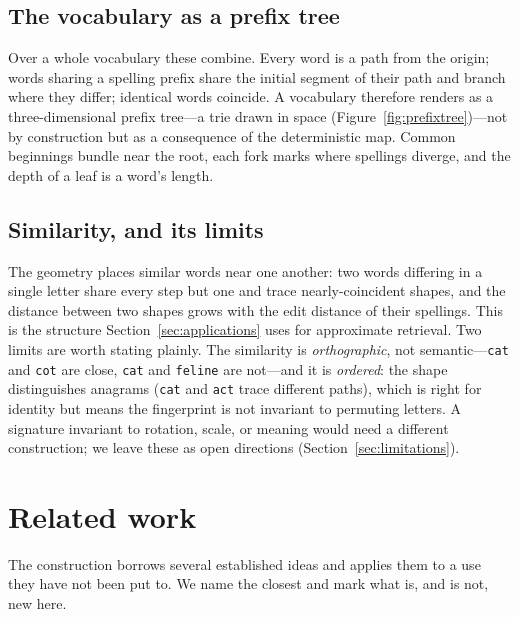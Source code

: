 \documentclass[11pt]{article}
\begin{document}
\subsection{The vocabulary as a prefix tree}

Over a whole vocabulary these combine. Every word is a path from the origin; words sharing a
spelling prefix share the initial segment of their path and branch where they differ;
identical words coincide. A vocabulary therefore renders as a three-dimensional prefix
tree---a trie drawn in space (Figure~\ref{fig:prefixtree})---not by construction but as a
consequence of the deterministic map. Common beginnings bundle near the root, each fork marks
where spellings diverge, and the depth of a leaf is a word's length.

\subsection{Similarity, and its limits}

The geometry places similar words near one another: two words differing in a single letter
share every step but one and trace nearly-coincident shapes, and the distance between two
shapes grows with the edit distance of their spellings. This is the structure
Section~\ref{sec:applications} uses for approximate retrieval. Two limits are worth stating
plainly. The similarity is \emph{orthographic}, not semantic---\texttt{cat} and \texttt{cot}
are close, \texttt{cat} and \texttt{feline} are not---and it is \emph{ordered}: the shape
distinguishes anagrams (\texttt{cat} and \texttt{act} trace different paths), which is right
for identity but means the fingerprint is not invariant to permuting letters. A signature
invariant to rotation, scale, or meaning would need a different construction; we leave these
as open directions (Section~\ref{sec:limitations}).

\section{Related work}\label{sec:related}

The construction borrows several established ideas and applies them to a use they have not
been put to. We name the closest and mark what is, and is not, new here.
\end{document}
